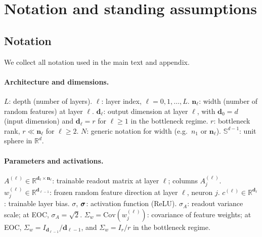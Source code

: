 \clearpage

\section{Notation and standing assumptions}\label{appendix:notation-assumptions}

\subsection{Notation}\label{appendix:notation-index}
We collect all notation used in the main text and appendix.

\paragraph{Architecture and dimensions.}
\(L\): depth (number of layers). \quad \(\ell\): layer index, \(\ell=0,1,\ldots,L\). \quad \(\bm{n}_\ell\): width (number of random features) at layer \(\ell\). \quad \(\bm{d}_\ell\): output dimension at layer \(\ell\), with \(\bm{d}_0=d\) (input dimension) and \(\bm{d}_\ell=r\) for \(\ell\ge 1\) in the bottleneck regime. \quad \(r\): bottleneck rank, \(r\ll \bm{n}_\ell\) for \(\ell\ge 2\). \quad \(N\): generic notation for width (e.g.\ \(n_1\) or \(\bm{n}_\ell\)). \quad \(\mathbb{S}^{d-1}\): unit sphere in \(\mathbb{R}^d\).

\paragraph{Parameters and activations.}
\(A^{(\ell)}\in\mathbb{R}^{\bm{d}_\ell\times \bm{n}_\ell}\): trainable readout matrix at layer \(\ell\); columns \(A^{(\ell)}_j\). \quad \(w^{(\ell)}_j\in\mathbb{R}^{\bm{d}_{\ell-1}}\): frozen random feature direction at layer \(\ell\), neuron \(j\). \quad \(c^{(\ell)}\in\mathbb{R}^{\bm{d}_\ell}\): trainable layer bias. \quad \(\sigma\), \(\bm{\mathrel{\boldsymbol{\sigma}}}\): activation function (ReLU). \quad \(\sigma_A\): readout variance scale; at EOC, \(\sigma_A=\sqrt{2}\). \quad \(\Sigma_w=\mathrm{Cov}(w^{(\ell)}_j)\): covariance of feature weights; at EOC, \(\Sigma_w=I_{\bm{d}_{\ell-1}}/\bm{d}_{\ell-1}\), and \(\Sigma_w=I_r/r\) in the bottleneck regime.

